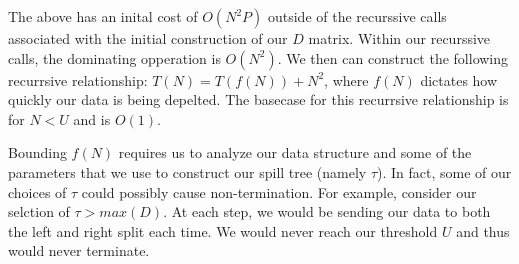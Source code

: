 \vspace{5 mm}
\noindent
The above has an inital cost of $O(N^{2} P)$ outside of the recurssive calls 
associated with the initial construction of our $D$ matrix. Within our 
recurssive calls, the dominating opperation is $O(N^{2})$. We then can 
construct the following recurrsive relationship: $T(N) = T(f(N)) + N^{2}$, 
where $f(N)$ dictates how quickly our data is being depelted. The basecase for 
this recurrsive relationship is for $N < U$ and is $O(1)$.

\vspace{5 mm}
\noindent
Bounding $f(N)$ requires us to analyze our data structure and some of the 
parameters that we use to construct our spill tree (namely $\tau$). In fact, 
some of our choices of $\tau$ could possibly cause non-termination. For 
example, consider our selction of $\tau > max(D)$. At each step, we would be 
sending our data to both the left and right split each time. We would never 
reach our threshold $U$ and thus would never terminate.

\newpage
